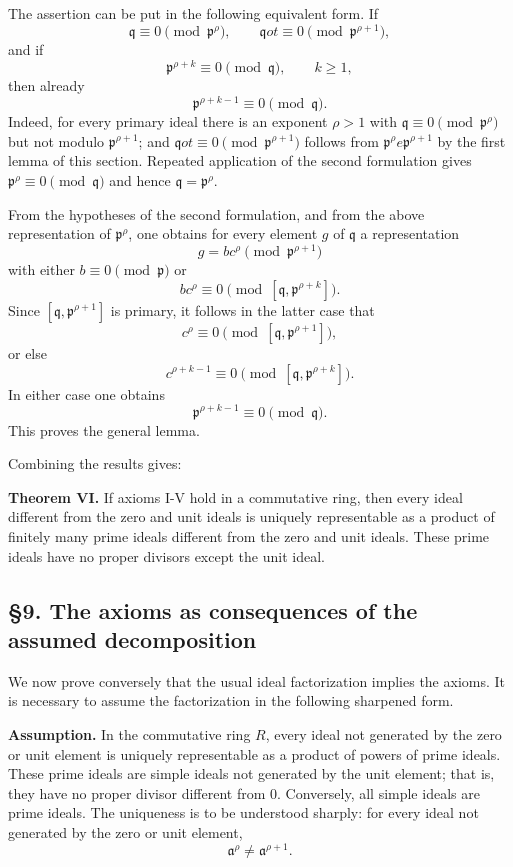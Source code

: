 \documentclass[
  12pt,
]{article}
\begin{document}
The assertion can be put in the following equivalent form. If \[
  \mathfrak q\equiv0\pmod{\mathfrak p^{\rho}},
  \qquad \mathfrak q
ot\equiv0\pmod{\mathfrak p^{\rho+1}},
\] and if \[
  \mathfrak p^{\rho+k}\equiv0\pmod{\mathfrak q},\qquad k\ge1,
\] then already \[
  \mathfrak p^{\rho+k-1}\equiv0\pmod{\mathfrak q}.
\] Indeed, for every primary ideal there is an exponent \(\rho>1\) with
\(\mathfrak q\equiv0\pmod{\mathfrak p^{\rho}}\) but not modulo
\(\mathfrak p^{\rho+1}\); and \(\mathfrak q
ot\equiv0\pmod{\mathfrak p^{\rho+1}}\) follows from \(\mathfrak p^{\rho}
e\mathfrak p^{\rho+1}\) by the first lemma of this section. Repeated
application of the second formulation gives
\(\mathfrak p^{\rho}\equiv0\pmod{\mathfrak q}\) and hence
\(\mathfrak q=\mathfrak p^{\rho}\).

From the hypotheses of the second formulation, and from the above
representation of \(\mathfrak p^{\rho}\), one obtains for every element
\(g\) of \(\mathfrak q\) a representation \[
  g=b c^{\rho} \pmod{\mathfrak p^{\rho+1}}
\] with either \(b\equiv0\pmod{\mathfrak p}\) or \[
  b c^{\rho}\equiv0\pmod{[\mathfrak q,\mathfrak p^{\rho+k}]}.
\] Since \([\mathfrak q,\mathfrak p^{\rho+1}]\) is primary, it follows
in the latter case that \[
  c^{\rho}\equiv0\pmod{[\mathfrak q,\mathfrak p^{\rho+1}]},
\] or else \[
  c^{\rho+k-1}\equiv0\pmod{[\mathfrak q,\mathfrak p^{\rho+k}]}.
\] In either case one obtains \[
  \mathfrak p^{\rho+k-1}\equiv0\pmod{\mathfrak q}.
\] This proves the general lemma.

Combining the results gives:

\textbf{Theorem VI.} If axioms I-V hold in a commutative ring, then
every ideal different from the zero and unit ideals is uniquely
representable as a product of finitely many prime ideals different from
the zero and unit ideals. These prime ideals have no proper divisors
except the unit ideal.

\subsection{§9. The axioms as consequences of the assumed
decomposition}\label{the-axioms-as-consequences-of-the-assumed-decomposition}

We now prove conversely that the usual ideal factorization implies the
axioms. It is necessary to assume the factorization in the following
sharpened form.

\textbf{Assumption.} In the commutative ring \(R\), every ideal not
generated by the zero or unit element is uniquely representable as a
product of powers of prime ideals. These prime ideals are simple ideals
not generated by the unit element; that is, they have no proper divisor
different from \(0\). Conversely, all simple ideals are prime ideals.
The uniqueness is to be understood sharply: for every ideal not
generated by the zero or unit element, \[
  \mathfrak a^{\rho}\ne\mathfrak a^{\rho+1}.
\]
\end{document}
